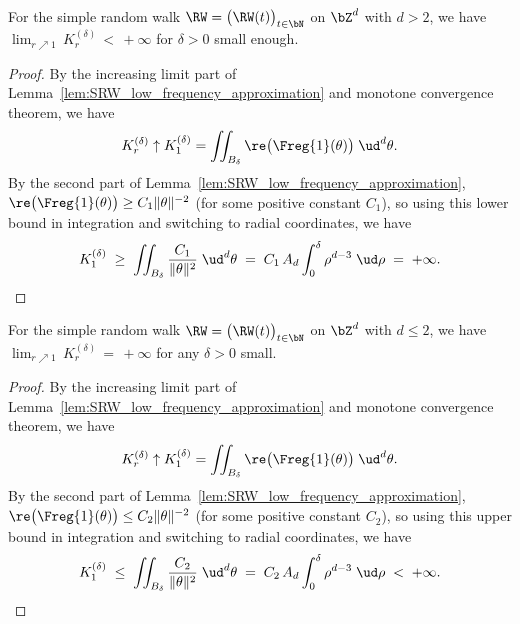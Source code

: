 \begin{lemma}
  \label{lem:SRW_low_frequency_convergence}
  For the simple random walk $\RW = \big(\RW(t)\big)_{t \in \bN}$ on $\bZ^d$
  with $d > 2$,
  we have $\lim_{r \nearrow 1} \, K_r^{(\delta)} \, < \, +\infty$
  for $\delta > 0$ small enough.
\end{lemma}
\begin{proof}
By the increasing limit part of
Lemma~\ref{lem:SRW_low_frequency_approximation} and
monotone convergence theorem, we have
\begin{align*}
K_r^{(\delta)} \uparrow K_1^{(\delta)}
  = \iint_{B_\delta} \re \big( \Freg{1} (\theta) \big) \; \ud^d \theta .
\end{align*}
By the second part of Lemma~\ref{lem:SRW_low_frequency_approximation},
$\re \big( \Freg{1}(\theta) \big) \ge C_1 \| \theta \|^{-2}$ (for some positive constant $C_1$),
so using this lower bound in integration and switching to radial
coordinates, we have
\begin{align*}
  K_1^{(\delta)}
  \; \ge \; \iint_{B_\delta} \frac{C_1}{\|\theta\|^2} \; \ud^d \theta
  \; = \; C_1 \, A_d \int_{0}^{\delta} \rho^{d-3} \; \ud \rho
  \; = \;  + \infty .
\end{align*}
\end{proof}

\begin{lemma}
  \label{lem:SRW_low_frequency_divergence}
  For the simple random walk $\RW = \big(\RW(t)\big)_{t \in \bN}$ on $\bZ^d$
  with $d \le 2$,
  we have $\lim_{r \nearrow 1} \, K_r^{(\delta)} \, = \, +\infty$
  for any $\delta > 0$ small.
\end{lemma}
\begin{proof}
  By the increasing limit part of
  Lemma~\ref{lem:SRW_low_frequency_approximation} and
  monotone convergence theorem, we have
  \begin{align*}
  K_r^{(\delta)} \uparrow K_1^{(\delta)}
    = \iint_{B_\delta} \re \big( \Freg{1} (\theta) \big) \; \ud^d \theta .
  \end{align*}
  By the second part of Lemma~\ref{lem:SRW_low_frequency_approximation},
  $\re \big( \Freg{1}(\theta) \big) \le C_2 \| \theta \|^{-2}$ (for some positive constant $C_2$),
  so using this upper bound in integration and switching to radial
  coordinates, we have
  \begin{align*}
    K_1^{(\delta)}
    \; \le \; \iint_{B_\delta} \frac{C_2}{\|\theta\|^2} \; \ud^d \theta
    \; = \; C_2 \, A_d \int_{0}^{\delta} \rho^{d-3} \; \ud \rho
    \; < \;  + \infty .
  \end{align*}
\end{proof}
